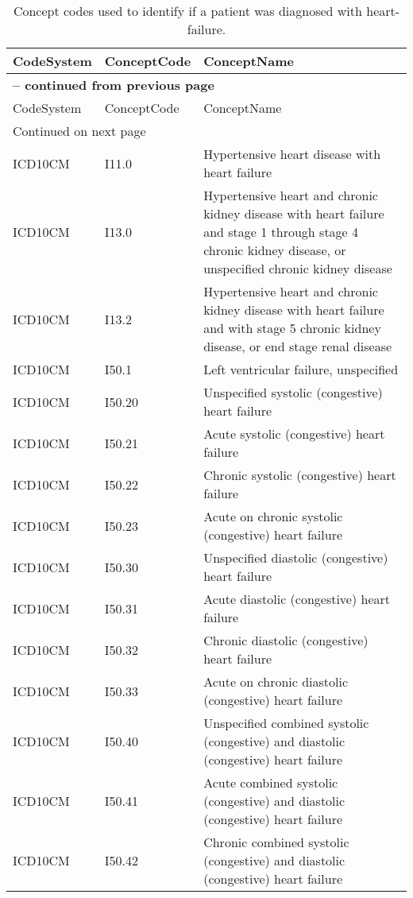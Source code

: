 \begin{longtable}{p{}p{}p{}}
\caption{Concept codes used to identify if a patient was diagnosed with heart-failure.} \\ 
 CodeSystem & ConceptCode & ConceptName \\ 
  \hline 
\endfirsthead 
\multicolumn{3}{p{\textwidth}}{{ \bfseries \tablename \thetable{} -- continued from previous page}} \\ 
\hline CodeSystem & ConceptCode & ConceptName \\ \hline 
\endhead 
\hline \multicolumn{3}{p{\textwidth}}{{Continued on next page}} \\ \hline 
\endfoot 
\hline 
\endlastfoot 
 \hline
ICD10CM & I11.0 & Hypertensive heart disease with heart failure \\ 
  ICD10CM & I13.0 & Hypertensive heart and chronic kidney disease with heart failure and stage 1 through stage 4 chronic kidney disease, or unspecified chronic kidney disease \\ 
  ICD10CM & I13.2 & Hypertensive heart and chronic kidney disease with heart failure and with stage 5 chronic kidney disease, or end stage renal disease \\ 
  ICD10CM & I50.1 & Left ventricular failure, unspecified \\ 
  ICD10CM & I50.20 & Unspecified systolic (congestive) heart failure \\ 
  ICD10CM & I50.21 & Acute systolic (congestive) heart failure \\ 
  ICD10CM & I50.22 & Chronic systolic (congestive) heart failure \\ 
  ICD10CM & I50.23 & Acute on chronic systolic (congestive) heart failure \\ 
  ICD10CM & I50.30 & Unspecified diastolic (congestive) heart failure \\ 
  ICD10CM & I50.31 & Acute diastolic (congestive) heart failure \\ 
  ICD10CM & I50.32 & Chronic diastolic (congestive) heart failure \\ 
  ICD10CM & I50.33 & Acute on chronic diastolic (congestive) heart failure \\ 
  ICD10CM & I50.40 & Unspecified combined systolic (congestive) and diastolic (congestive) heart failure \\ 
  ICD10CM & I50.41 & Acute combined systolic (congestive) and diastolic (congestive) heart failure \\ 
  ICD10CM & I50.42 & Chronic combined systolic (congestive) and diastolic (congestive) heart failure \\ 

\end{longtable}
